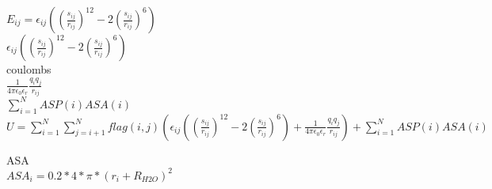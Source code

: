 \documentclass{article}
\begin{document}
\changefontsizes{10pt}
$E_{ij}=\epsilon_{ij}\left(\left(\frac{s_{ij}}{r_{ij}}\right)^{12}-2\left(\frac{s_{ij}}{r_{ij}}\right)^{6}\right)$ \\

$\epsilon_{ij}\left(\left(\frac{s_{ij}}{r_{ij}}\right)^{12}-2\left(\frac{s_{ij}}{r_{ij}}\right)^{6}\right)$ \\

coulombs \\
$\frac{1}{4\pi\epsilon_{0}\epsilon_{r}}\frac{q_{i}q_{j}}{r_{ij}}$ \\

$ \sum_{i=1}^{N} ASP(i)ASA(i)$ \\

$U = \sum_{i=1}^{N} \sum_{j=i+1}^{N} flag(i,j)
\left(\epsilon_{ij}\left(\left(\frac{s_{ij}}{r_{ij}}\right)^{12}-2\left(\frac{s_{ij}}{r_{ij}}\right)^{6}\right)+\frac{1}{4\pi\epsilon_{0}\epsilon_{r}}\frac{q_{i}q_{j}}{r_{ij}}\right)+
\sum_{i=1}^{N} ASP(i)ASA(i)$

ASA \\
$ASA_i=0.2*4*\pi*(r_i+R_{H2O})^2$
\end{document}
